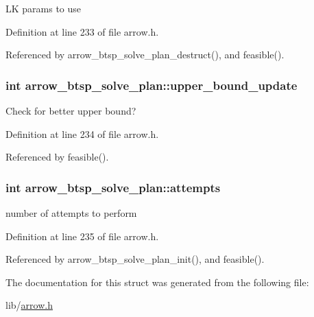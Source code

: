 LK params to use 

Definition at line 233 of file arrow.h.

Referenced by arrow\_\-btsp\_\-solve\_\-plan\_\-destruct(), and feasible().\hypertarget{structarrow__btsp__solve__plan_5ac6a38c297df040797c63babc4c02c3}{
\subsubsection{\setlength{\rightskip}{0pt plus 5cm}int {\bf arrow\_\-btsp\_\-solve\_\-plan::upper\_\-bound\_\-update}}}
\label{structarrow__btsp__solve__plan_5ac6a38c297df040797c63babc4c02c3}


Check for better upper bound? 

Definition at line 234 of file arrow.h.

Referenced by feasible().\hypertarget{structarrow__btsp__solve__plan_acfa3d4257a33548a9f60ee568219bc5}{
\subsubsection{\setlength{\rightskip}{0pt plus 5cm}int {\bf arrow\_\-btsp\_\-solve\_\-plan::attempts}}}
\label{structarrow__btsp__solve__plan_acfa3d4257a33548a9f60ee568219bc5}


number of attempts to perform 

Definition at line 235 of file arrow.h.

Referenced by arrow\_\-btsp\_\-solve\_\-plan\_\-init(), and feasible().

The documentation for this struct was generated from the following file:\begin{CompactItemize}
\item 
lib/\hyperlink{arrow_8h}{arrow.h}\end{CompactItemize}
